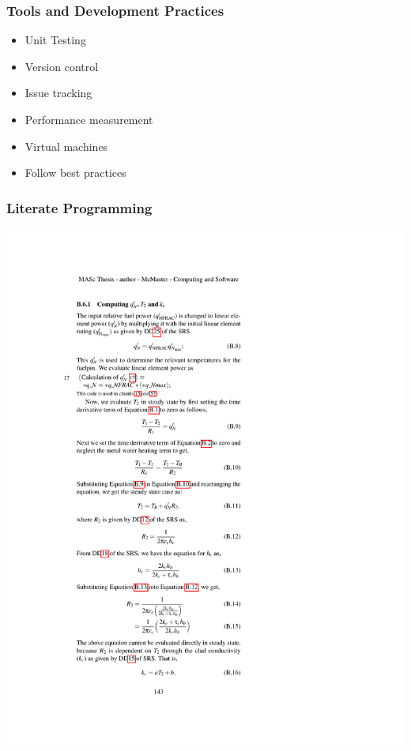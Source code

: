 \documentclass{beamer}
\begin{document}
\begin{frame}

\frametitle{Tools and Development Practices}

\begin{itemize}
\item Unit Testing
\item Version control
\item Issue tracking
\item Performance measurement
\item Virtual machines
\item Follow best practices \citep{WilsonEtAl2014}
\end{itemize}

\end{frame}


\begin{frame}[plain]

\frametitle{Literate Programming}

\hspace{-2.3cm}
\includegraphics[width=1.22\columnwidth]{qnfrac.pdf}

\end{frame}
\end{document}
